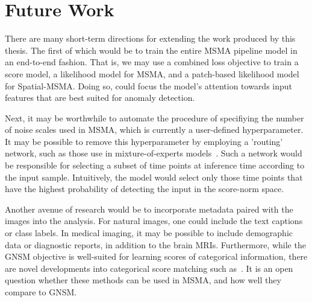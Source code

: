 

\section{Future Work}

There are many short-term directions for extending the work produced by this thesis. The first of which would be to train the entire MSMA pipeline model in an end-to-end fashion. That is, we may use a combined loss objective to train a score model, a likelihood model for MSMA, and a patch-based likelihood model for Spatial-MSMA. Doing so, could focus the model's attention towards input features that are best suited for anomaly detection.

Next, it may be worthwhile to automate the procedure of specifiying the number of noise scales used in MSMA, which is currently a user-defined hyperparameter. It may be possible to remove this hyperparameter by employing a 'routing' network, such as those use in mixture-of-experts models~\cite{zoph2022stmoe}. Such a network would be responsible for selecting a subset of time points at inference time according to the input sample. Intuitively, the model would select only those time points that have the highest probability of detecting the input in the score-norm space.

Another avenue of research would be to incorporate metadata paired with the images into the analysis. For natural images, one could include the text captions or class labels. In medical imaging, it may be possible to include demographic data or diagnostic reports, in addition to the brain MRIs. Furthermore, while the GNSM objective is well-suited for learning scores of categorical information, there are novel developments into categorical score matching such as~\cite{graves2024bayesian,lou2024discrete}. It is an open question whether these methods can be used in MSMA, and how well they compare to GNSM.

